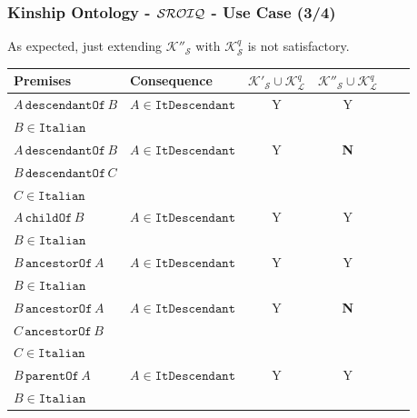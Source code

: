 \documentclass[8pt]{beamer}
\newcommand{\child}{\mathtt{childOf}}
\newcommand{\parent}{\mathtt{parentOf}}
\newcommand{\ancestor}{\mathtt{ancestorOf}}
\newcommand{\descendant}{\mathtt{descendantOf}}
\newcommand{\Alice}{A}
\newcommand{\Bob}{B}
\newcommand{\Charlie}{C}
\newcommand{\KBsetsq}{\mathcal{K}^{q}_\mathcal{L}}
\newcommand{\KBtra}{\mathcal{K}'_{\mathcal{S}}}
\newcommand{\KBirr}{\mathcal{K}''_{\mathcal{S}}}
\newcommand{\KBq}{\mathcal{K}^{q}_{\mathcal{S}}}
\newcommand{\italian}{\mathtt{Italian}}
\newcommand{\withitanc}{\mathtt{ItDescendant}}
\newcommand{\testpassed}{\textsf{Y}}
\newcommand{\testfailed}{\bf{\textsf{N}}}
\begin{document}
\begin{frame}
\frametitle{Kinship Ontology - $\mathcal{SROIQ}$ - Use Case (3/4)}
As expected, just extending $\KBirr$ with $\KBq$ is not satisfactory.
\vspace{\baselineskip}

\begin{small}
\begin{center}
\begin{tabular}{|l|l|c|c|c|c|}
\hline
\bf{Premises} & \bf{Consequence} & $\KBtra \cup \KBsetsq$ & $\KBirr \cup \KBsetsq$\\
\hline
  $\Alice\,\descendant\,\Bob$ & $\Alice \in \withitanc$ & \testpassed & \testpassed \\
  $\Bob \in \italian$ & & &\\
\hline
  $\Alice\,\descendant\,\Bob$ & $\Alice \in \withitanc$ & \testpassed & \testfailed\\
  $\Bob\,\descendant\,\Charlie$ & & &\\
  $\Charlie \in \italian$ & & &\\
\hline
  $\Alice\,\child\,\Bob$ & $\Alice \in \withitanc$ & \testpassed & \testpassed\\
  $\Bob \in \italian$ & & & \\
\hline
  $\Bob\,\ancestor\,\Alice$ & $\Alice \in \withitanc$ & \testpassed & \testpassed\\
  $\Bob \in \italian$ & & & \\
\hline
  $\Bob\,\ancestor\,\Alice$ & $\Alice \in \withitanc$ & \testpassed & \testfailed\\
  $\Charlie\,\ancestor\,\Bob$ & & &\\
  $\Charlie \in \italian$ & & &\\
\hline
  $\Bob\,\parent\,\Alice$ & $\Alice \in \withitanc$ & \testpassed & \testpassed\\
  $\Bob \in \italian$ & & &\\
\hline
\end{tabular}
\end{center}
\end{small}
\end{frame}
\end{document}
